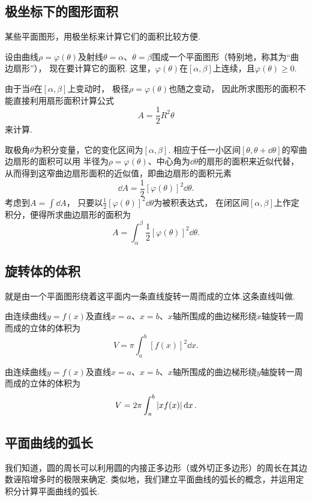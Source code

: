 \subsection{极坐标下的图形面积}
某些平面图形，用极坐标来计算它们的面积比较方便.

设由曲线\(\rho = \varphi(\theta)\)及射线\(\theta=\alpha\)、\(\theta=\beta\)围成一个平面图形（特别地，称其为“曲边扇形”），
现在要计算它的面积.
这里，\(\varphi(\theta)\)在\([\alpha,\beta]\)上连续，且\(\varphi(\theta)\geq0\).

由于当\(\theta\)在\([\alpha,\beta]\)上变动时，
极径\(\rho=\varphi(\theta)\)也随之变动，
因此所求图形的面积不能直接利用扇形面积计算公式\[
    A = \frac{1}{2} R^2 \theta
\]来计算.

取极角\(\theta\)为积分变量，它的变化区间为\([\alpha,\beta]\).
相应于任一小区间\([\theta,\theta+\dd{\theta}]\)的窄曲边扇形的面积可以用
半径为\(\rho=\varphi(\theta)\)、中心角为\(\dd{\theta}\)的扇形的面积来近似代替，
从而得到这窄曲边扇形面积的近似值，即曲边扇形的面积元素\[
    \dd{A}
    = \frac{1}{2} [\varphi(\theta)]^2 \dd{\theta}.
\]
考虑到\(A = \int \dd{A}\)，
只要以\(\frac{1}{2} [\varphi(\theta)]^2 \dd{\theta}\)为被积表达式，
在闭区间\([\alpha,\beta]\)上作定积分，便得所求曲边扇形的面积为\[
A = \int_{\alpha}^{\beta} \frac{1}{2} [\varphi(\theta)]^2 \dd{\theta}.
\]

\subsection{旋转体的体积}
\begin{definition}[旋转体]
就是由一个平面图形绕着这平面内一条直线旋转一周而成的立体.这条直线叫做.
\end{definition}

由连续曲线\(y=f(x)\)及直线\(x=a\)、\(x=b\)、\(x\)轴所围成的曲边梯形绕\(x\)轴旋转一周而成的立体的体积为
\begin{equation}\label{equation:定积分.曲边梯形绕x轴旋转体的体积}
V = \pi \int_a^b [f(x)]^2 \dd{x}.
\end{equation}

由连续曲线\(y=f(x)\)及直线\(x=a\)、\(x=b\)、\(x\)轴所围成的曲边梯形绕\(y\)轴旋转一周而成的立体的体积为
\begin{equation}\label{equation:定积分.曲边梯形绕y轴旋转体的体积}
V = 2\pi \int_a^b \abs{x f(x)} \dd{x}.
\end{equation}

\subsection{平面曲线的弧长}
我们知道，圆的周长可以利用圆的内接正多边形（或外切正多边形）的周长在其边数诬陷增多时的极限来确定.
类似地，我们建立平面曲线的弧长的概念，并运用定积分计算平面曲线的弧长.

